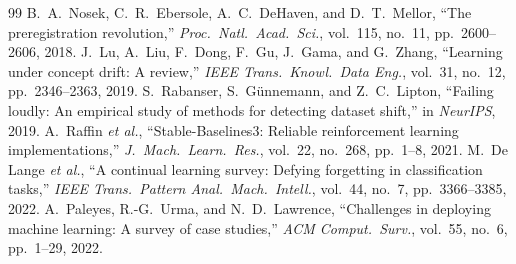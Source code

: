 \documentclass[conference]{IEEEtran}
\begin{document}
\begin{thebibliography}{99}
 B.\ A.\ Nosek, C.\ R.\ Ebersole, A.\ C.\ DeHaven, and D.\ T.\ Mellor, ``The preregistration revolution,'' \emph{Proc.\ Natl.\ Acad.\ Sci.}, vol.\ 115, no.\ 11, pp.\ 2600--2606, 2018.
 J.\ Lu, A.\ Liu, F.\ Dong, F.\ Gu, J.\ Gama, and G.\ Zhang, ``Learning under concept drift: A review,'' \emph{IEEE Trans.\ Knowl.\ Data Eng.}, vol.\ 31, no.\ 12, pp.\ 2346--2363, 2019.
 S.\ Rabanser, S.\ G\"unnemann, and Z.\ C.\ Lipton, ``Failing loudly: An empirical study of methods for detecting dataset shift,'' in \emph{NeurIPS}, 2019.
 A.\ Raffin \emph{et al.}, ``Stable-Baselines3: Reliable reinforcement learning implementations,'' \emph{J.\ Mach.\ Learn.\ Res.}, vol.\ 22, no.\ 268, pp.\ 1--8, 2021.
 M.\ De Lange \emph{et al.}, ``A continual learning survey: Defying forgetting in classification tasks,'' \emph{IEEE Trans.\ Pattern Anal.\ Mach.\ Intell.}, vol.\ 44, no.\ 7, pp.\ 3366--3385, 2022.
 A.\ Paleyes, R.-G.\ Urma, and N.\ D.\ Lawrence, ``Challenges in deploying machine learning: A survey of case studies,'' \emph{ACM Comput.\ Surv.}, vol.\ 55, no.\ 6, pp.\ 1--29, 2022.
\end{thebibliography}
\end{document}
